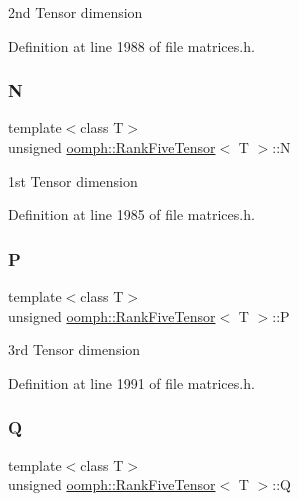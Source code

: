 2nd Tensor dimension 



Definition at line 1988 of file matrices.\+h.

\mbox{\label{classoomph_1_1RankFiveTensor_aeea12f3e80605e2c7b6b4a8ec47bf91c}} 
\subsubsection{\texorpdfstring{N}{N}}
{\footnotesize\ttfamily template$<$class T$>$ \\
unsigned \hyperlink{classoomph_1_1RankFiveTensor}{oomph\+::\+Rank\+Five\+Tensor}$<$ T $>$\+::N\hspace{0.3cm}{\ttfamily [private]}}



1st Tensor dimension 



Definition at line 1985 of file matrices.\+h.

\mbox{\label{classoomph_1_1RankFiveTensor_ab23d40bd6af9279e1e35362249c32855}} 
\subsubsection{\texorpdfstring{P}{P}}
{\footnotesize\ttfamily template$<$class T$>$ \\
unsigned \hyperlink{classoomph_1_1RankFiveTensor}{oomph\+::\+Rank\+Five\+Tensor}$<$ T $>$\+::P\hspace{0.3cm}{\ttfamily [private]}}



3rd Tensor dimension 



Definition at line 1991 of file matrices.\+h.

\mbox{\label{classoomph_1_1RankFiveTensor_a68d3c3387b64dc8124cb0800ab4814a5}} 
\subsubsection{\texorpdfstring{Q}{Q}}
{\footnotesize\ttfamily template$<$class T$>$ \\
unsigned \hyperlink{classoomph_1_1RankFiveTensor}{oomph\+::\+Rank\+Five\+Tensor}$<$ T $>$\+::Q\hspace{0.3cm}{\ttfamily [private]}}



